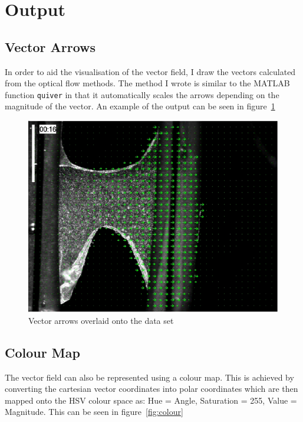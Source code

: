 \documentclass[a4paper,10pt]{article}
\begin{document}
  \section{Output}
  
    \subsection{Vector Arrows}
    
      In order to aid the visualisation of the vector field, I draw the vectors calculated from the optical flow methods. The method I wrote is similar to the MATLAB function \verb|quiver| in that it automatically scales the arrows depending on the magnitude of the vector. An example of the output can be seen in figure~\ref{fig:quiver}
      
      \begin{figure}[htbp!]
        \centering
        \includegraphics[width=.3\textwidth]{quiver}
        \caption{Vector arrows overlaid onto the data set}
        \label{fig:quiver}
      \end{figure}
    
    \subsection{Colour Map}
    
      The vector field can also be represented using a colour map. This is achieved by converting the cartesian vector coordinates into polar coordinates which are then mapped onto the HSV colour space as: Hue = Angle, Saturation = 255, Value = Magnitude. This can be seen in figure~\ref{fig:colour}
      
\end{document}

